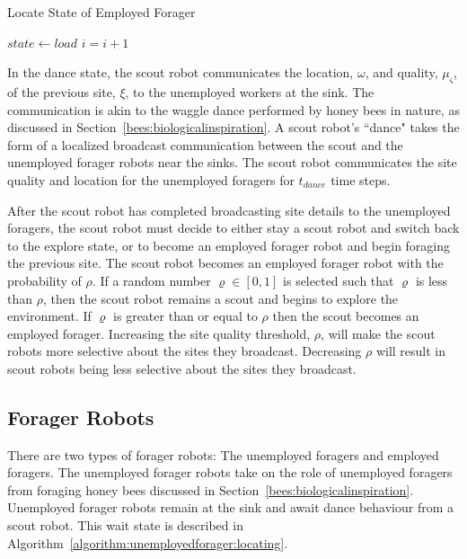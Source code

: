 \begin{algorithm}
\caption{Locate State of Employed Forager}
\label{algorithm:employedforager:locating}
\begin{algorithmic}[1]
	\State {}
	\State {}
		\State $state \gets load$
	\EndIf
	\State $i =i + 1$
\EndFunction
\end{algorithmic}
\end{algorithm}

In the dance state, the scout robot communicates the location, $\omega$, and quality, $\mu_\varsigma$, of the previous site, $\xi$, to the unemployed workers at the sink. The communication is akin to the waggle dance performed by honey bees in nature, as discussed in Section~\ref{bees:biologicalinspiration}. A scout robot's ``dance" takes the form of a localized broadcast communication between the scout and the unemployed forager robots near the sinks. The scout robot communicates the site quality and location for the unemployed foragers for $t_{dance}$ time steps.

After the scout robot has completed broadcasting site details to the unemployed foragers, the scout robot must decide to either stay a scout robot and switch back to the explore state, or to become an employed forager robot and begin foraging the previous site. The scout robot becomes an employed forager robot with the probability of $\rho$. If a random number $\varrho\in[0,1]$ is selected such that $\varrho$ is less than $\rho$, then the scout robot remains a scout and begins to explore the environment. If $\varrho$ is greater than or equal to $\rho$ then the scout becomes an employed forager. Increasing the site quality threshold, $\rho$, will make the scout robots more selective about the sites they broadcast. Decreasing $\rho$ will result in scout robots being less selective about the sites they broadcast.

\subsection{Forager Robots}
\label{foragerrobots}

There are two types of forager robots: The unemployed foragers and employed foragers. The unemployed forager robots take on the role of unemployed foragers from foraging honey bees discussed in Section~\ref{bees:biologicalinspiration}. Unemployed forager robots remain at the sink and await dance behaviour from a scout robot. This wait state is described in Algorithm~\ref{algorithm:unemployedforager:locating}.

